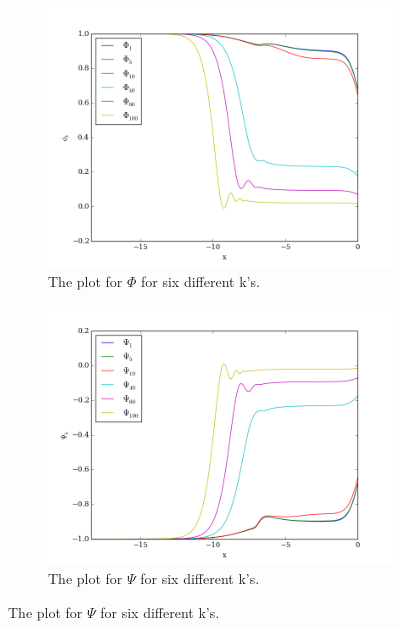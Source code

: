 \documentclass[a4paper]{report}
\begin{document}
\begin{figure}[ht]
\begin{subfigure}{.5\textwidth}
  \includegraphics[width=\textwidth]{Phi.png}
 \caption{The plot for $\Phi$ for six different k's.}
 \label{fig:Phi}
\end{subfigure}
\begin{subfigure}{.5\textwidth}
\includegraphics[width=\textwidth]{Psi.png}
 \caption{The plot for $\Psi$ for six different k's.}
 \label{fig:Psi}
\end{subfigure}

\end{figure}
\end{document}
